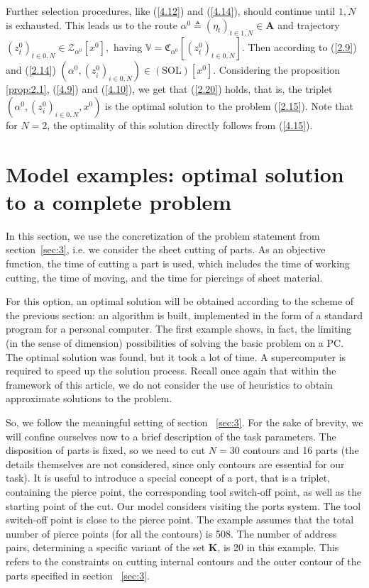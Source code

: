 \documentclass[numbers,sort&compress]{IntechOpen-Book}%
\begin{document}
Further selection procedures,
like (\ref{4.12}) and (\ref{4.14}),
should continue until
$\overline{1, N}$ is exhausted.
This leads us to the route
$\alpha^0 {\triangleq} (\eta_t)_{t \in \overline{1,N}} \in \mathbf{A}$
and trajectory
$(z_t^0)_{t \in \overline{0,N}} \in \mathcal{Z}_{\alpha^0}[x^0],$
having
$\mathbb{V} = \mathfrak{C}_{\alpha^0}[(z_t^0)_{t \in \overline{0,N}}]$.
Then according to
 (\ref{2.9}) and (\ref{2.14})
$(\alpha^0,(z_i^0)_{i \in \overline{0,N}}) \in (\mathrm{\mathrm{SOL}})[x^0]$.
Considering the proposition
\ref{prop:2.1}, (\ref{4.9}) and (\ref{4.10}),
we get that (\ref{2.20}) holds,
that is, the triplet
$(\alpha^0,(z_i^0)_{i \in \overline{0,N}},x^0)$
is the optimal solution to the problem
 (\ref{2.15}).
Note that
for $ N = 2 $,
the optimality of this solution directly follows from
 (\ref{4.15}).

\section{Model examples: optimal solution to a complete problem}
\label{sec:5}

In this section, we use the concretization of the problem statement from section~\ref{sec:3}, i.e. we consider the sheet cutting of parts. As an objective function, the time of cutting a part is used, which includes the time of working cutting, the time of moving, and the time for piercings of sheet material.


For this option, an optimal solution will be obtained according to the scheme of the previous section:
an algorithm is built, implemented in the form of a standard program for a personal computer.
The first example shows, in fact, the limiting (in the sense of dimension) possibilities of solving the basic problem on a PC.
The optimal solution was found, but it took a lot of time.
A supercomputer is required to speed up the solution process.
Recall once again that within the framework of this article,
we do not consider the use of heuristics
to obtain approximate solutions to the problem.

So, we follow the meaningful setting of section ~\ref{sec:3}.
For the sake of brevity,
we will confine ourselves now to a brief description of the task parameters.
The disposition of parts is fixed,
so we need to cut
$N = 30$
contours
and 16 parts
(the details themselves are not considered,
since only contours are essential for our task).
It is useful to introduce a special concept of a port,
that is a triplet,
containing the pierce point,
the corresponding tool switch-off point,
as well as the starting point of the cut.
Our model considers
visiting the ports system.
The tool switch-off point is close to the pierce point.
The example assumes that the total number of pierce points
(for all the contours)
is 508.
The number of address pairs,
determining a specific variant of the set
$\mathbf{K}$,
is 20
in this example.
This refers to
the constraints
on cutting internal contours
and the outer contour of the parts specified in section ~\ref{sec:3}.
\end{document}
